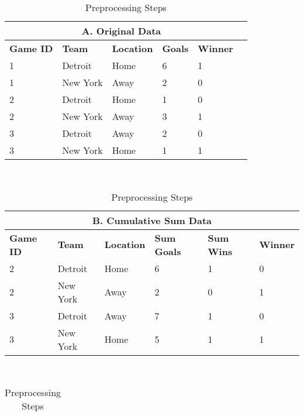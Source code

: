 \documentclass[letterpaper, 10 pt, conference]{ieeeconf}
\begin{document}
\begin{table}[h]
\centering
\caption{Preprocessing Steps}
\begin{tabular}{llllll}

\multicolumn{5}{c}{\textbf{A. Original Data}}                                                    \\\toprule
\textbf{Game ID}    & \textbf{Team}              & \textbf{Location}         & \textbf{Goals}       & \textbf{Winner}             \\\midrule1          & Detroit           & Home             & 6           & 1                  \\1          & New York          & Away             & 2           & 0                  \\\hline2          & Detroit           & Home             & 1           & 0                  \\2          & New York          & Away             & 3           & 1                  \\\hline3          & Detroit           & Away             & 2           & 0                  \\3          & New York          & Home             & 1           & 1                  \\\bottomrule\end{tabular}\\
\medskip
\centering
\begin{tabular}{@{}llllll@{}}

\multicolumn{6}{c}{\textbf{B. Cumulative Sum Data}}                                                                    \\\toprule 
\textbf{Game ID} & \textbf{Team} & \textbf{Location} & \textbf{Sum Goals} & \textbf{Sum Wins} & \textbf{Winner} \\\midrule
2                & Detroit       & Home              & 6                    & 1                   & 0               \\
2                & New York      & Away              & 2                    & 0                   & 1               \\\hline
3                & Detroit       & Away              & 7                    & 1                   & 0               \\
3                & New York      & Home              & 5                    & 1                   & 1               \\ \bottomrule
\end{tabular}\\
\medskip
\centering
\begin{tabular}{@{}llllll@{}}


\end{tabular}
\end{table}
\end{document}
